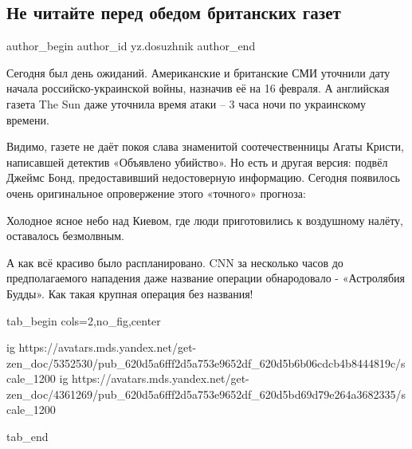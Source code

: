  
 
 
 
 
 
\subsection{Не читайте перед обедом британских газет}
\label{sec:16_02_2022.yz.dosuzhnik.1.brit_gazety_vtorzhenie}
 
\ifcmt
 author_begin
   author_id yz.dosuzhnik
 author_end
\fi

Сегодня был день ожиданий. Американские и британские СМИ уточнили дату начала
российско-украинской войны, назначив её на 16 февраля. А английская газета The
Sun даже уточнила время атаки – 3 часа ночи по украинскому времени.

Видимо, газете не даёт покоя слава знаменитой соотечественницы Агаты Кристи,
написавшей детектив «Объявлено убийство». Но есть и другая версия: подвёл
Джеймс Бонд, предоставивший недостоверную информацию. Сегодня появилось очень
оригинальное опровержение этого «точного» прогноза:

\begin{zznagolos}
Холодное ясное небо над Киевом, где люди приготовились к воздушному налёту,
оставалось безмолвным.	
\end{zznagolos}

А как всё красиво было распланировано. CNN за несколько часов до
предполагаемого нападения даже название операции обнародовало - «Астролябия
Будды». Как такая крупная операция без названия!

\ifcmt
  tab_begin cols=2,no_fig,center

  ig https://avatars.mds.yandex.net/get-zen_doc/5352530/pub_620d5a6fff2d5a753e9652df_620d5b6b06cdcb4b8444819c/scale_1200
	ig https://avatars.mds.yandex.net/get-zen_doc/4361269/pub_620d5a6fff2d5a753e9652df_620d5bd69d79e264a3682335/scale_1200

  tab_end
\fi

